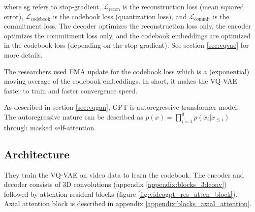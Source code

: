 where $\text{sg}$ refers to stop-gradient, $\mathcal{L}_\text{recon}$ is the reconstruction loss (mean squared error), $\mathcal{L}_\text{codebook}$ is the codebook loss (quantization loss), and $\mathcal{L}_\text{commit}$ is the commitment loss. The decoder optimizes the reconstruction loss only, the encoder optimizes the commitment loss only, and the codebook embeddings are optimized in the codebook loss (depending on the stop-gradient). See section \ref{sec:vqvae} for more details.

The researchers used EMA update \cite{vqvae} for the codebook loss which is a (exponential) moving average of the codebook embeddings. In short, it makes the VQ-VAE faster to train and faster convergence speed.

As described in section \ref{sec:vqgan}, GPT is autoregressive transformer model. The autoregressive nature can be described as $p(x) = \prod_{i=1}^{d} p(x_i | x_{\leq i})$ through masked self-attention.






\subsection{Architecture}

They train the VQ-VAE on video data to learn the codebook. The encoder and decoder consists of 3D convolutions (appendix \ref{appendix:blocks_3dconv}) followed by attention residual blocks (figure \ref{fig:videogpt_res_atten_block}). Axial attention block is described in appendix \ref{appendix:blocks_axial_attention}.